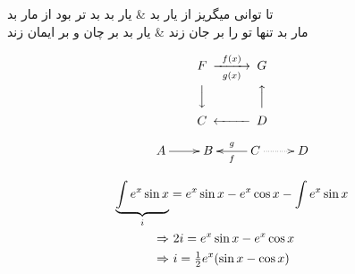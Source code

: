 \documentclass[a4paper,12pt]{article}
\begin{document}
\begin{traditionalpoem}
تا توانی میگریز از یار بد &
یار بد بد تر بود از مار بد \\
مار بد تنها تو را بر جان زند &
یار بد بر چان و بر ایمان زند \\
\end{traditionalpoem}


\[
 \begin{CD}
  F @>f(x)>g(x)> G\\
  @VVV @AAA\\
  C @<<< D\\
 \end{CD}
\]

\[
\xymatrix{
A \ar[r] & B & \ar[l]^-{f}_{g} C \ar@{.>}[r] & D
}
\]

\begin{multicols}{2}
\begin{align*}
 \underbrace{\int e^x \sin x}_{\romannumeral 1} &= e^x \sin x - e^x \cos x - \int e^x \sin x \\
 \Rightarrow & \ 2 \romannumeral 1 = e^x \sin x - e^x \cos x \\
 \Rightarrow & \  \romannumeral 1 = \tfrac12 e^x (\sin x - \cos x) \\
\end{align*}
\hfill
\columnbreak

\end{multicols}
\end{document}

